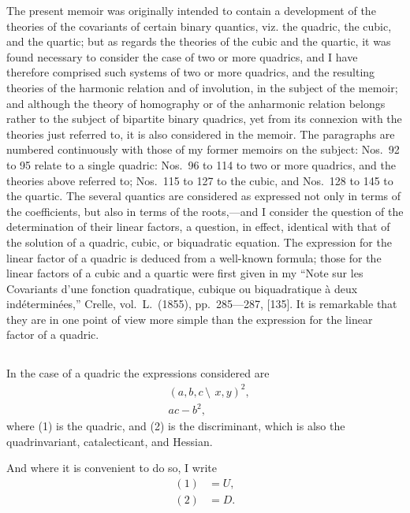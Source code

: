 \documentclass[12pt,a4paper]{article}
\begin{document}
The present memoir was originally intended to contain a development of the theories of the covariants of certain binary quantics, viz. the quadric, the cubic, and the quartic; but as regards the theories of the cubic and the quartic, it was found necessary to consider the case of two or more quadrics, and I have therefore comprised such systems of two or more quadrics, and the resulting theories of the harmonic relation and of involution, in the subject of the memoir; and although the theory of homography or of the anharmonic relation belongs rather to the subject of bipartite binary quadrics, yet from its connexion with the theories just referred to, it is also considered in the memoir. The paragraphs are numbered continuously with those of my former memoirs on the subject: Nos.~92 to 95 relate to a single quadric: Nos.~96 to 114 to two or more quadrics, and the theories above referred to; Nos.~115 to 127 to the cubic, and Nos.~128 to 145 to the quartic. The several quantics are considered as expressed not only in terms of the coefficients, but also in terms of the roots,---and I consider the question of the determination of their linear factors, a question, in effect, identical with that of the solution of a quadric, cubic, or biquadratic equation. The expression for the linear factor of a quadric is deduced from a well-known formula; those for the linear factors of a cubic and a quartic were first given in my ``Note sur les Covariants d'une fonction quadratique, cubique ou biquadratique \`a deux ind\'etermin\'ees,'' Crelle, vol.~L.~(1855), pp.~285---287, [135]. It is remarkable that they are in one point of view more simple than the expression for the linear factor of a quadric.

\setcounter{subsection}{91}

\subsection{}

In the case of a quadric the expressions considered are
\begin{align}
&(a, b, c\,\setminus\!\!\:\, x, y)^2, \tag{1}\\
&ac - b^2, \tag{2}
\end{align}
where (1) is the quadric, and (2) is the discriminant, which is also the quadrinvariant, catalecticant, and Hessian.

And where it is convenient to do so, I write
\begin{align*}
(1) &= U,\\
(2) &= D.
\end{align*}
\end{document}

